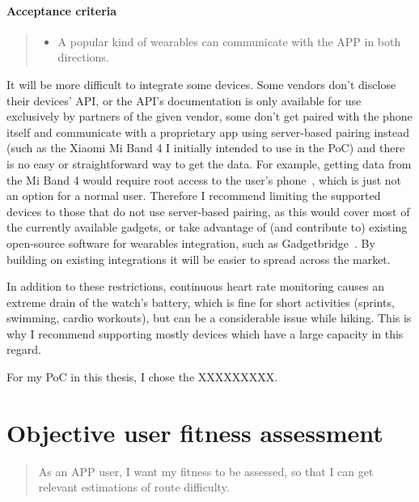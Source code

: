 \paragraph*{Acceptance criteria}
\begin{quote}
\begin{itemize}
    \item A popular kind of wearables can communicate with the APP in both directions.
\end{itemize}
\end{quote}

It will be more difficult to integrate some devices.
Some vendors don't disclose their devices' API, or the API's documentation is only available for use exclusively by partners of the given vendor,
some don't get paired with the phone itself and communicate with a proprietary app using server-based pairing instead (such as the Xiaomi Mi Band 4 I initially intended to use in the PoC) and there is no easy or straightforward way to get the data.
For example, getting data from the Mi Band 4 would require root access to the user's phone~\cite{miband4-server-based}, which is just not an option for a normal user.
Therefore I recommend limiting the supported devices to those that do not use server-based pairing, as this would cover most of the currently available gadgets,
or take advantage of (and contribute to) existing open-source software for wearables integration, such as Gadgetbridge~\cite{Gadgetbridge}.
By building on existing integrations it will be easier to spread across the market.

In addition to these restrictions, continuous heart rate monitoring causes an extreme drain of the watch's battery, which is fine for short activities (sprints, swimming, cardio workouts), but can be a considerable issue while hiking.
This is why I recommend supporting mostly devices which have a large capacity in this regard.

For my PoC in this thesis, I chose the XXXXXXXXX.


\section{Objective user fitness assessment}\label{epic:fit}
\begin{quote}
As an APP user, I want my fitness to be assessed, so that I can get relevant estimations of route difficulty.
\end{quote}

